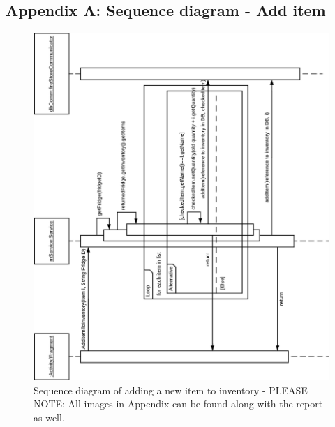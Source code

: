 \documentclass[12pt]{article}
\begin{document}
\subsection{Appendix A: Sequence diagram - Add item}
\begin{figure}[H]
	\centering
	\includegraphics[width=180mm]{Img/APPENDIX A - SD-ADD-ITEM.pdf}
	\caption{Sequence diagram of adding a new item to inventory - PLEASE NOTE: All images in Appendix can be found along with the report as well.}
	\label{fig:SD_addItem}
\end{figure}
\end{document}
